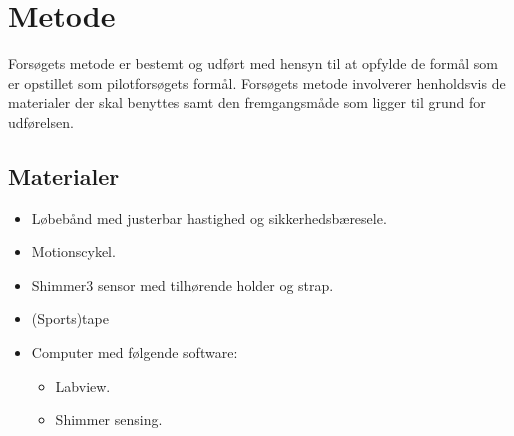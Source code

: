 
\section{Metode}
Forsøgets metode er bestemt og udført med hensyn til at opfylde de formål som er opstillet som pilotforsøgets formål. \newline
Forsøgets metode involverer henholdsvis de materialer der skal benyttes samt den fremgangsmåde som ligger til grund for udførelsen.

\subsection{Materialer}
\begin{itemize}
	\item Løbebånd med justerbar hastighed og sikkerhedsbæresele.
	\item Motionscykel.
	\item Shimmer3 sensor med tilhørende holder og strap.
	\item (Sports)tape
	\item Computer med følgende software:
	\begin{itemize}
		\item Labview.
		\item Shimmer sensing.
	\end{itemize}
\end{itemize}

